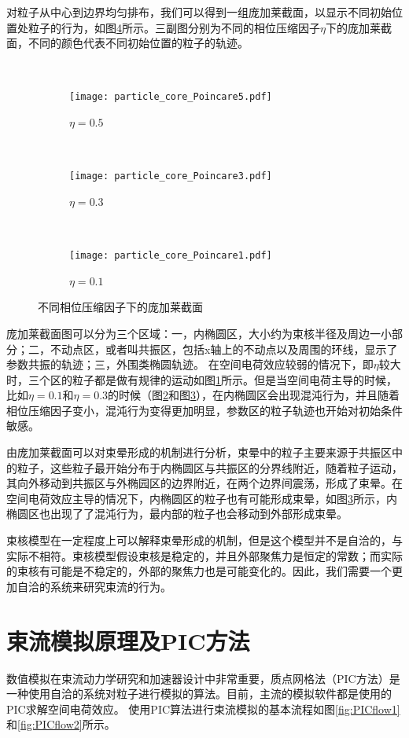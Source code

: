 对粒子从中心到边界均匀排布，我们可以得到一组庞加莱截面，以显示不同初始位置处粒子的行为，如图\ref{fig:particle_core_Poincare}所示。三副图分别为不同的相位压缩因子$\eta$下的庞加莱截面，不同的颜色代表不同初始位置的粒子的轨迹。
\begin{figure}[!htbp]
  \centering
  ~%
  \begin{subfigure}[b]{0.6\textwidth}
    \texttt{[image: particle\_core\_Poincare5.pdf]}
    \caption{$\eta = 0.5$}
    \label{fig:particle_core_Poincare5}
  \end{subfigure}
  ~
  \begin{subfigure}[b]{0.6\textwidth}
    \texttt{[image: particle\_core\_Poincare3.pdf]}
    \caption{$\eta = 0.3$}
    \label{fig:particle_core_Poincare3}
  \end{subfigure}%
  ~
  \begin{subfigure}[b]{0.6\textwidth}
    \texttt{[image: particle\_core\_Poincare1.pdf]}
    \caption{$\eta = 0.1$}
    \label{fig:particle_core_Poincare1}
  \end{subfigure}%
  \caption{不同相位压缩因子下的庞加莱截面}
  \label{fig:particle_core_Poincare}
\end{figure}

庞加莱截面图可以分为三个区域：一，内椭圆区，大小约为束核半径及周边一小部分；二，不动点区，或者叫共振区，包括x轴上的不动点以及周围的环线，显示了参数共振的轨迹；三，外围类椭圆轨迹。
在空间电荷效应较弱的情况下，即$\eta$较大时，三个区的粒子都是做有规律的运动如图\ref{fig:particle_core_Poincare5}所示。但是当空间电荷主导的时候，比如$\eta=0.1$和$\eta=0.3$的时候（图\ref{fig:particle_core_Poincare3}和图\ref{fig:particle_core_Poincare1}），在内椭圆区会出现混沌行为，并且随着相位压缩因子变小，混沌行为变得更加明显，参数区的粒子轨迹也开始对初始条件敏感。

由庞加莱截面可以对束晕形成的机制进行分析，束晕中的粒子主要来源于共振区中的粒子，这些粒子最开始分布于内椭圆区与共振区的分界线附近，随着粒子运动，其向外移动到共振区与外椭园区的边界附近，在两个边界间震荡，形成了束晕。在空间电荷效应主导的情况下，内椭圆区的粒子也有可能形成束晕，如图\ref{fig:particle_core_Poincare1}所示，内椭圆区也出现了了混沌行为，最内部的粒子也会移动到外部形成束晕。

束核模型在一定程度上可以解释束晕形成的机制，但是这个模型并不是自洽的，与实际不相符。束核模型假设束核是稳定的，并且外部聚焦力是恒定的常数；而实际的束核有可能是不稳定的，外部的聚焦力也是可能变化的。因此，我们需要一个更加自洽的系统来研究束流的行为。

\section{束流模拟原理及PIC方法}   \label{section:PIC_algorithm}
数值模拟在束流动力学研究和加速器设计中非常重要，质点网格法（PIC方法）是一种使用自洽的系统对粒子进行模拟的算法。目前，主流的模拟软件都是使用的PIC求解空间电荷效应\cite{PIC_Birdsall1991, PIC_friedman1992, PIC_ji2000, PIC_ji2004, PIC_Amundson2006229, PIC_tracewin2014, PIC_beampath2005}。
使用PIC算法进行束流模拟的基本流程如图\ref{fig:PICflow1}和\ref{fig:PICflow2}所示。

